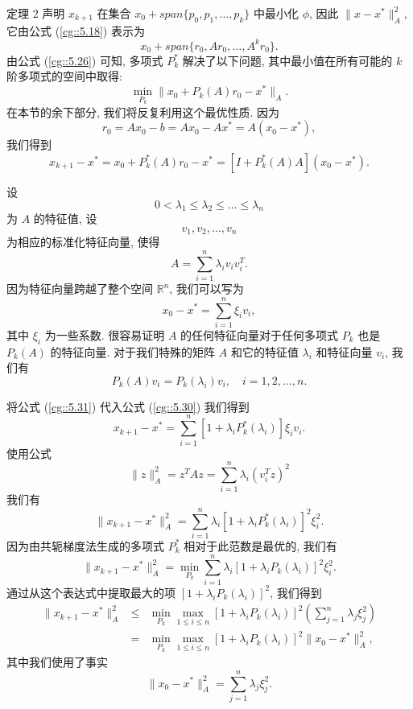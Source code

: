 \documentclass[a4paper]{ctexart}
\begin{document}
{定理 2 声明 $x_{k + 1}$ 在集合 $x_0 + span\{p_0, p_1, \ldots, p_k\}$ 中最小化 $\phi$, 
因此 $\|x - x^*\|_A^2$, 它由公式 (\ref{cg::5.18}) 表示为
$$
x_0 + span\{r_0, Ar_0, \ldots, A^kr_0\}.
$$
由公式 (\ref{cg::5.26}) 可知, 多项式 $P_k^*$ 解决了以下问题, 
其中最小值在所有可能的 $k$ 阶多项式的空间中取得:
\begin{equation}
  \min_{P_k}\|x_0 + P_k(A)r_0 - x^*\|_A. \label{cg::5.29}
\end{equation}
在本节的余下部分, 我们将反复利用这个最优性质.
因为
$$
r_0 = Ax_0 - b = Ax_0 - Ax^* = A(x_0 - x^*),
$$
我们得到
\begin{equation}
x_{k+1} - x^* = x_0 + P_k^*(A)r_0 - x^* = [I + P_k^*(A)A](x_0 - x^*). 
\label{cg::5.30}
\end{equation}

设 
$$
0 < \lambda_1 \leq \lambda_2 \leq \ldots \leq \lambda_n
$$
为 $A$ 的特征值, 设
$$
v_1, v_2, \ldots, v_n
$$
为相应的标准化特征向量, 使得
$$
A = \sum_{i=1}^{n} \lambda_iv_iv_i^T.
$$
因为特征向量跨越了整个空间 $\mathbb{R}^n$, 我们可以写为
\begin{equation}
  x_0 - x^* = \sum_{i=1}^{n} \xi_iv_i,
  \label{cg::5.31}
\end{equation}
其中 $\xi_i$ 为一些系数. 很容易证明 $A$ 的任何特征向量对于任何多项式
$P_k$ 也是 $P_k(A)$ 的特征向量. 
对于我们特殊的矩阵 $A$ 和它的特征值 $\lambda_i$ 和特征向量 $v_i$, 我们有
$$
P_k(A)v_i = P_k(\lambda_i)v_i, \quad i = 1, 2, \ldots, n.
$$

将公式 (\ref{cg::5.31}) 代入公式 (\ref{cg::5.30}) 我们得到
$$
x_{k+1} - x^* = \sum_{i=1}^{n} [1 + \lambda_i P^*_k (\lambda_i)] \xi_i v_i.
$$
使用公式 
$$
\|z\|^2_A = z^T Az = \sum_{i=1}^{n} \lambda_i (v_i^T z)^2
$$
我们有
\begin{equation}
\|x_{k+1} - x^*\|^2_A 
= \sum_{i=1}^{n} \lambda_i [1 + \lambda_i P^*_k (\lambda_i)]^2 \xi_i^2. \label{cg::5.32}
\end{equation}
因为由共轭梯度法生成的多项式 $P^*_k$ 相对于此范数是最优的, 我们有
$$
\|x_{k+1} - x^*\|^2_A 
= \min_{P_k} \sum_{i=1}^{n} \lambda_i [1 + \lambda_i P_k (\lambda_i)]^2 \xi_i^2.
$$
通过从这个表达式中提取最大的项 $[1 + \lambda_i P_k (\lambda_i)]^2$, 我们得到
\begin{equation}
  \begin{array}{rcl}
\|x_{k+1} - x^*\|^2_A &\leq& 
\min_{P_k} \max_{1 \leq i \leq n} 
[1 + \lambda_i P_k (\lambda_i)]^2 \left(\sum_{j=1}^{n} \lambda_j \xi_j^2\right) \\
&=& \min_{P_k} \max_{1 \leq i \leq n} [1 + \lambda_i P_k (\lambda_i)]^2 \|x_0 - x^*\|^2_A,
\label{cg::5.33}
  \end{array}
\end{equation}
其中我们使用了事实
$$
\|x_0 - x^*\|^2_A = \sum_{j=1}^{n} \lambda_j \xi_j^2.
$$

}
\end{document}
